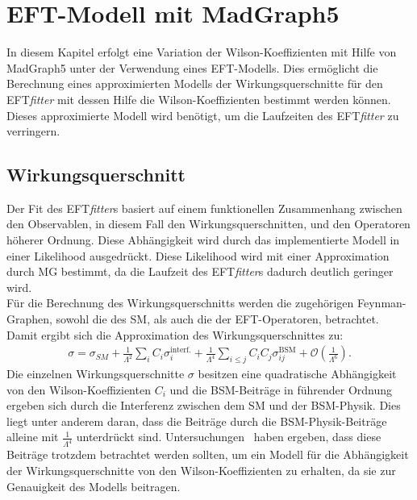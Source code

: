 \chapter{EFT-Modell mit MadGraph5}
In diesem Kapitel erfolgt eine Variation der Wilson-Koeffizienten mit Hilfe  von MadGraph5 unter der Verwendung eines EFT-Modells. Dies ermöglicht die Berechnung eines approximierten Modells der Wirkungsquerschnitte für den EFT\textit{fitter} mit dessen Hilfe die Wilson-Koeffizienten bestimmt werden können. Dieses approximierte Modell wird benötigt, um die Laufzeiten des EFT\textit{fitter} zu verringern.

\section{Wirkungsquerschnitt}
Der Fit des EFT\textit{fitter}s basiert auf einem funktionellen Zusammenhang zwischen den Observablen, in diesem Fall den Wirkungsquerschnitten, und den Operatoren höherer Ordnung. Diese Abhängigkeit wird durch das implementierte Modell in einer Likelihood ausgedrückt. Diese Likelihood wird mit einer Approximation durch MG bestimmt, da die Laufzeit des EFT\textit{fitter}s dadurch deutlich geringer wird.\\
Für die Berechnung des Wirkungsquerschnitts werden die zugehörigen Feynman-Graphen, sowohl die des SM, als auch die der EFT-Operatoren, betrachtet. Damit ergibt sich die Approximation des Wirkungsquerschnittes zu:
\begin{align}
  \sigma = \sigma_{SM} + \frac{1}{\Lambda^2} \sum_{i} C_i \sigma_i^\text{interf.} + \frac{1}{\Lambda^4} \sum_{i \leq j} C_i C_j \sigma_{ij}^\text{BSM} + \mathcal{O} \left(\frac{1}{\Lambda^6}\right).
\end{align}
Die einzelnen Wirkungsquerschnitte $\sigma$ besitzen eine quadratische Abhängigkeit von den Wilson-Koeffizienten $C_i$ und die BSM-Beiträge in führender Ordnung ergeben sich durch die Interferenz zwischen dem SM und der BSM-Physik. Dies liegt unter anderem daran, dass die Beiträge durch die BSM-Physik-Beiträge alleine mit $\frac{1}{\Lambda^4}$ unterdrückt sind. Untersuchungen~\cite{Wilson-Beiträge} haben ergeben, dass diese Beiträge trotzdem betrachtet werden sollten, um ein Modell für die Abhängigkeit der Wirkungsquerschnitte von den Wilson-Koeffizienten zu erhalten, da sie zur Genauigkeit des Modells beitragen.

